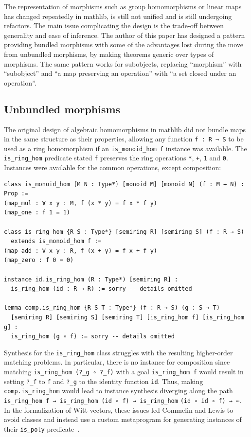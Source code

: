 \documentclass[a4paper,UKenglish,cleveref, autoref, thm-restate]{lipics-v2021}
\newcommand{\mathlib}{\textsf{mathlib}\xspace}
\begin{document}
The representation of morphisms such as group homomorphisms or linear maps has changed repeatedly in \mathlib,
is still not unified and is still undergoing refactors.
The main issue complicating the design is the trade-off between generality and ease of inference.
The author of this paper has designed a pattern providing bundled morphisms with some of the advantages lost during the move from unbundled morphisms,
by making theorems generic over types of morphisms.
The same pattern works for subobjects, replacing ``morphism'' with ``subobject'' and ``a map preserving an operation'' with ``a set closed under an operation''.

\subsection{Unbundled morphisms}
The original design of algebraic homomorphisms in \mathlib did not bundle maps in the same structure as their properties,
allowing any function \lstinline{f : R → S} to be used as a ring homomorphism if an \lstinline{is_monoid_hom f} instance was available.
The \lstinline{is_ring_hom} predicate stated \lstinline{f} preserves the ring operations \lstinline{*}, \lstinline{+}, \lstinline{1} and \lstinline{0}.
Instances were available for the common operations, except composition:
\begin{lstlisting}
class is_monoid_hom {M N : Type*} [monoid M] [monoid N] (f : M → N) : Prop :=
(map_mul : ∀ x y : M, f (x * y) = f x * f y)
(map_one : f 1 = 1)

class is_ring_hom {R S : Type*} [semiring R] [semiring S] (f : R → S)
  extends is_monoid_hom f :=
(map_add : ∀ x y : R, f (x + y) = f x + f y)
(map_zero : f 0 = 0)

instance id.is_ring_hom (R : Type*) [semiring R] :
  is_ring_hom (id : R → R) := sorry -- details omitted

lemma comp.is_ring_hom {R S T : Type*} (f : R → S) (g : S → T)
  [semiring R] [semiring S] [semiring T] [is_ring_hom f] [is_ring_hom g] :
  is_ring_hom (g ∘ f) := sorry -- details omitted
\end{lstlisting}

Synthesis for the \mbox{\lstinline{is_ring_hom}} class struggles with the resulting higher-order matching problems.
In particular, there is no instance for composition since matching \lstinline{is_ring_hom (?_g ∘ ?_f)} with a goal \lstinline{is_ring_hom f}
would result in setting \lstinline{?_f} to \lstinline{f} and \lstinline{?_g} to the identity function \lstinline{id}.
Thus, making \lstinline{comp.is_ring_hom} would lead to instance synthesis diverging along the path \lstinline{is_ring_hom f → is_ring_hom (id ∘ f) → is_ring_hom} \lstinline{(id ∘ id ∘ f) → ⋯}.
In the formalization of Witt vectors, these issues led Commelin and Lewis to avoid classes and instead use a custom metaprogram for generating instances of their \lstinline{is_poly} predicate~\cite{Witt-vectors}.
\end{document}

